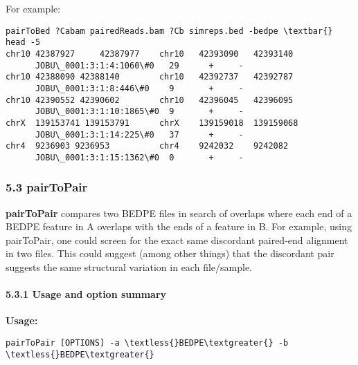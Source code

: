 \documentclass[letterpaper,10pt,english]{sphinxmanual}
\begin{document}
For example:

\begin{Verbatim}[commandchars=\\\{\}]
pairToBed ?Cabam pairedReads.bam ?Cb simreps.bed -bedpe \textbar{} head -5
chr10 42387927     42387977    chr10   42393090   42393140
      JOBU\_0001:3:1:4:1060\#0   29      +     -
chr10 42388090 42388140        chr10   42392737   42392787
      JOBU\_0001:3:1:8:446\#0    9       +     -
chr10 42390552 42390602        chr10   42396045   42396095
      JOBU\_0001:3:1:10:1865\#0  9       +     -
chrX  139153741 139153791      chrX    139159018  139159068
      JOBU\_0001:3:1:14:225\#0   37      +     -
chr4  9236903 9236953          chr4    9242032    9242082
      JOBU\_0001:3:1:15:1362\#0  0       +     -
\end{Verbatim}


\subsubsection{5.3 pairToPair}
\label{content/pairToPair:pairtopair}\label{content/pairToPair::doc}
\textbf{pairToPair} compares two BEDPE files in search of overlaps where each end of a BEDPE feature in A
overlaps with the ends of a feature in B. For example, using pairToPair, one could screen for the exact
same discordant paired-end alignment in two files. This could suggest (among other things) that the
discordant pair suggests the same structural variation in each file/sample.


\paragraph{5.3.1 Usage and option summary}
\label{content/pairToPair:usage-and-option-summary}
\textbf{Usage:}

\begin{Verbatim}[commandchars=\\\{\}]
pairToPair [OPTIONS] -a \textless{}BEDPE\textgreater{} -b \textless{}BEDPE\textgreater{}
\end{Verbatim}
\end{document}
